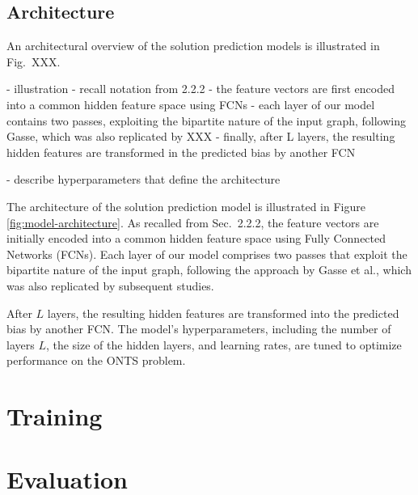 \subsection{Architecture}

An architectural overview of the solution prediction models is illustrated in Fig.~XXX.

- illustration
- recall notation from 2.2.2
- the feature vectors are first encoded into a common hidden feature space using FCNs
- each layer of our model contains two passes, exploiting the bipartite nature of the input graph, following Gasse, which was also replicated by XXX
- finally, after L layers, the resulting hidden features are transformed in the predicted bias by another FCN

- describe hyperparameters that define the architecture


The architecture of the solution prediction model is illustrated in Figure \ref{fig:model-architecture}. As recalled from Sec.~2.2.2, the feature vectors are initially encoded into a common hidden feature space using Fully Connected Networks (FCNs). Each layer of our model comprises two passes that exploit the bipartite nature of the input graph, following the approach by Gasse et al., which was also replicated by subsequent studies.


After \(L\) layers, the resulting hidden features are transformed into the predicted bias by another FCN. The model's hyperparameters, including the number of layers \(L\), the size of the hidden layers, and learning rates, are tuned to optimize performance on the ONTS problem.


\section{Training}

\section{Evaluation}

